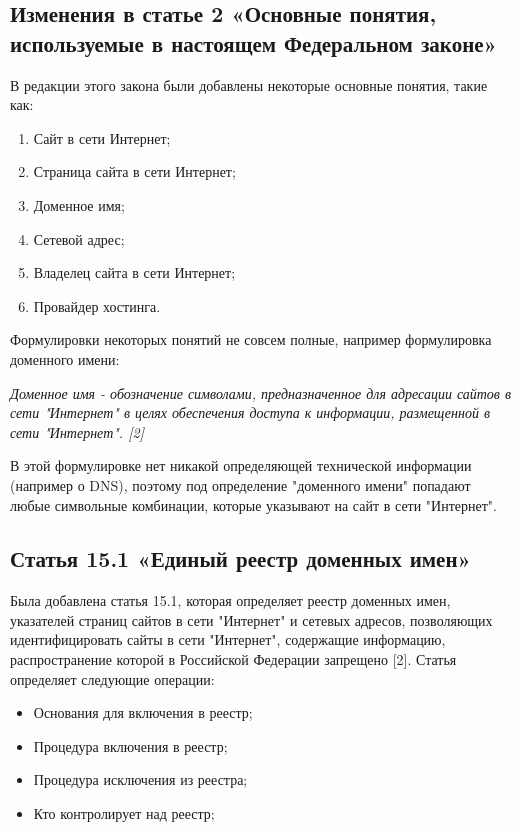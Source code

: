 \documentclass[14pt,a4paper,report]{article}
\begin{document}
\subsection{Изменения в статье 2 «Основные понятия, используемые в настоящем Федеральном законе»}

В редакции этого закона были добавлены некоторые основные понятия, такие как:

\begin{enumerate}
	\item Сайт в сети Интернет;
	\item Страница сайта в сети Интернет;
	\item Доменное имя;
	\item Сетевой адрес;
	\item Владелец сайта в сети Интернет;
	\item Провайдер хостинга.
\end{enumerate}

Формулировки некоторых понятий не совсем полные, например формулировка доменного имени:

\begin{displayquote}
\emph{Доменное имя - обозначение символами, предназначенное для адресации сайтов в сети "Интернет" в целях обеспечения доступа к информации, размещенной в сети "Интернет". [2]}
\end{displayquote}

В этой формулировке нет никакой определяющей технической информации (например о DNS), поэтому под определение "доменного имени" попадают любые символьные комбинации, которые указывают на сайт в сети "Интернет". 

\subsection{Статья 15.1 «Единый реестр доменных имен»}

Была добавлена статья 15.1, которая определяет реестр доменных имен, указателей страниц сайтов в сети "Интернет" и сетевых адресов, позволяющих идентифицировать сайты в сети "Интернет", содержащие информацию, распространение которой в Российской Федерации запрещено [2]. Статья определяет следующие операции:

\begin{itemize}
	\item Основания для включения в реестр;
	\item Процедура включения в реестр;
	\item Процедура исключения из реестра;
	\item Кто контролирует над реестр;
\end{itemize}
\end{document}
